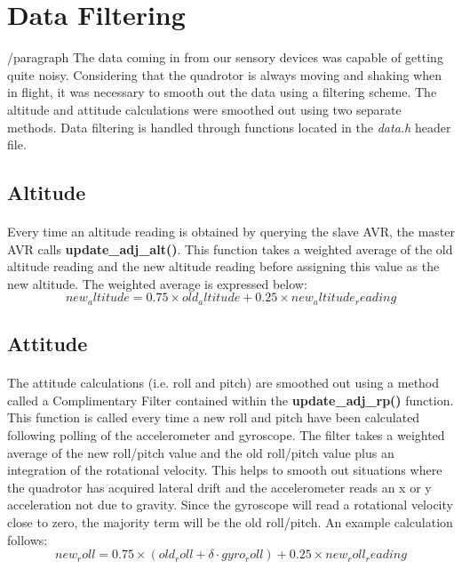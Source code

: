 \section{Data Filtering}

/paragraph{}
The data coming in from our sensory devices was capable of getting quite noisy.  Considering that the quadrotor is always moving and shaking when in flight, it was necessary to smooth out the data using a filtering scheme.  The altitude and attitude calculations were smoothed out using two separate methods.  Data filtering is handled through functions located in the {\it data.h} header file.

\subsection{Altitude}

\paragraph{}
Every time an altitude reading is obtained by querying the slave AVR, the master AVR calls {\bf update_adj_alt()}.  This function takes a weighted average of the old altitude reading and the new altitude reading before assigning this value as the new altitude.  The weighted average is expressed below:
\begin{equation}
new_altitude = 0.75 \times old_altitude + 0.25 \times new_altitude_reading
\end{equation}

\subsection{Attitude}

\paragraph{}
The attitude calculations (i.e. roll and pitch) are smoothed out using a method called a Complimentary Filter contained within the {\bf update_adj_rp()} function.  This function is called every time a new roll and pitch have been calculated following polling of the accelerometer and gyroscope.  The filter takes a weighted average of the new roll/pitch value and the old roll/pitch value plus an integration of the rotational velocity.  This helps to smooth out situations where the quadrotor has acquired lateral drift and the accelerometer reads an x or y acceleration not due to gravity.  Since the gyroscope will read a rotational velocity close to zero, the majority term will be the old roll/pitch.  An example calculation follows:
\begin{equation}
new_roll = 0.75 \times (old_roll + \delta \cdot gyro_roll) + 0.25 \times new_roll_reading
\end{equation}